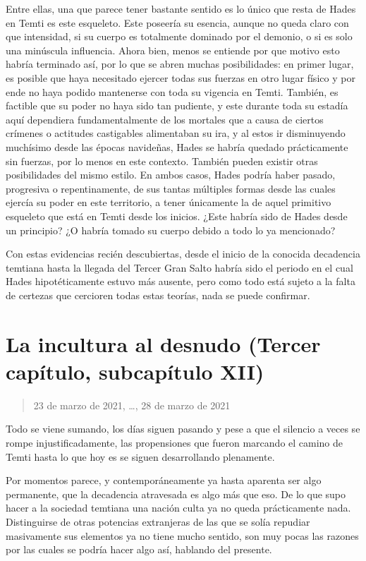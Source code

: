 \documentclass[
  spanish,
]{book}
\begin{document}
Entre ellas, una que parece tener bastante sentido es lo único que resta de Hades en Temti es este esqueleto. Este poseería su esencia, aunque no queda claro con que intensidad, si su cuerpo es totalmente dominado por el demonio, o si es solo una minúscula influencia. Ahora bien, menos se entiende por que motivo esto habría terminado así, por lo que se abren muchas posibilidades: en primer lugar, es posible que haya necesitado ejercer todas sus fuerzas en otro lugar físico y por ende no haya podido mantenerse con toda su vigencia en Temti. También, es factible que su poder no haya sido tan pudiente, y este durante toda su estadía aquí dependiera fundamentalmente de los mortales que a causa de ciertos crímenes o actitudes castigables alimentaban su ira, y al estos ir disminuyendo muchísimo desde las épocas navideñas, Hades se habría quedado prácticamente sin fuerzas, por lo menos en este contexto. También pueden existir otras posibilidades del mismo estilo. En ambos casos, Hades podría haber pasado, progresiva o repentinamente, de sus tantas múltiples formas desde las cuales ejercía su poder en este territorio, a tener únicamente la de aquel primitivo esqueleto que está en Temti desde los inicios. ¿Este habría sido de Hades desde un principio? ¿O habría tomado su cuerpo debido a todo lo ya mencionado?

Con estas evidencias recién descubiertas, desde el inicio de la conocida decadencia temtiana hasta la llegada del Tercer Gran Salto habría sido el periodo en el cual Hades hipotéticamente estuvo más ausente, pero como todo está sujeto a la falta de certezas que cercioren todas estas teorías, nada se puede confirmar.

\hypertarget{la-incultura-al-desnudo-tercer-capuxedtulo-subcapuxedtulo-xii}{%
\section{La incultura al desnudo (Tercer capítulo, subcapítulo XII)}\label{la-incultura-al-desnudo-tercer-capuxedtulo-subcapuxedtulo-xii}}

\begin{quote}
23 de marzo de 2021, \ldots, 28 de marzo de 2021
\end{quote}

Todo se viene sumando, los días siguen pasando y pese a que el silencio a veces se rompe injustificadamente, las propensiones que fueron marcando el camino de Temti hasta lo que hoy es se siguen desarrollando plenamente.

Por momentos parece, y contemporáneamente ya hasta aparenta ser algo permanente, que la decadencia atravesada es algo más que eso. De lo que supo hacer a la sociedad temtiana una nación culta ya no queda prácticamente nada. Distinguirse de otras potencias extranjeras de las que se solía repudiar masivamente sus elementos ya no tiene mucho sentido, son muy pocas las razones por las cuales se podría hacer algo así, hablando del presente.
\end{document}
